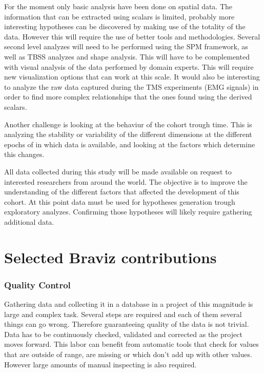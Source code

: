 For the moment only basic analysis have been done on spatial data. The information that can be extracted using scalars is limited, probably more interesting hypotheses can be discovered by making use of the totality of the data. However this will require the use of better tools and methodologies. Several second level analyzes will need to be performed using the SPM framework, as well as TBSS analyzes and shape analysis. This will have to be complemented with visual analysis of the data performed by domain experts. This will require new visualization options that can work at this scale. It would also be interesting to analyze the raw data captured during the TMS experiments (EMG signals) in order to find more complex relationships that the ones found using the derived scalars. 

Another challenge is looking at the behaviur of the cohort trough time. This is analyzing the stability or variability of the different dimensions at the different epochs of in which data is available, and looking at the factors which determine this changes.

All data collected during this study will be made available on request to interested researchers from around the world. The objective is to improve the understanding of the different factors that affected the development of this cohort. At this point data must be used for hypotheses generation trough exploratory analyzes. Confirming those hypotheses will likely require gathering additional data.



\section{Selected Braviz contributions}

\subsubsection{Quality Control}

Gathering data and collecting it in a database in a project of this magnitude is large and complex task. Several steps are required and each of them several things can go wrong. Therefore guaranteeing quality of the data is not trivial. Data has to be continuously checked, validated and corrected as the project moves forward. This labor can benefit from automatic tools that check for values that are outside of range, are missing or which don't add up with other values. However large amounts of manual inspecting is also required. 

